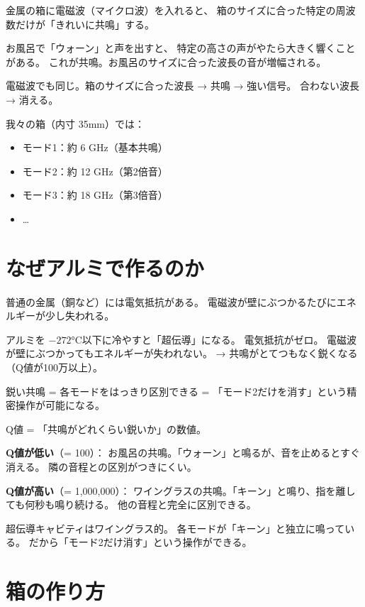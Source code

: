 \documentclass[12pt,a4paper]{article}
\begin{document}
金属の箱に電磁波（マイクロ波）を入れると、
箱のサイズに合った特定の周波数だけが「きれいに共鳴」する。

\begin{naruhodox}[共鳴とは]
お風呂で「ウォーン」と声を出すと、
特定の高さの声がやたら大きく響くことがある。
これが共鳴。お風呂のサイズに合った波長の音が増幅される。

電磁波でも同じ。箱のサイズに合った波長 → 共鳴 → 強い信号。
合わない波長 → 消える。

我々の箱（内寸 35mm）では：
\begin{itemize}
\item モード1：約 6 GHz（基本共鳴）
\item モード2：約 12 GHz（第2倍音）
\item モード3：約 18 GHz（第3倍音）
\item \ldots
\end{itemize}
\end{naruhodox}

\section{なぜアルミで作るのか}

\begin{naruhodox}[超伝導のすごさ]
普通の金属（銅など）には電気抵抗がある。
電磁波が壁にぶつかるたびにエネルギーが少し失われる。

アルミを $-272$°C以下に冷やすと「超伝導」になる。
電気抵抗がゼロ。
電磁波が壁にぶつかってもエネルギーが失われない。
→ 共鳴がとてつもなく鋭くなる（Q値が100万以上）。

鋭い共鳴 = 各モードをはっきり区別できる
= 「モード2だけを消す」という精密操作が可能になる。
\end{naruhodox}

\begin{tatoebabox}
Q値 = 「共鳴がどれくらい鋭いか」の数値。

\textbf{Q値が低い}（= 100）：
お風呂の共鳴。「ウォーン」と鳴るが、音を止めるとすぐ消える。
隣の音程との区別がつきにくい。

\textbf{Q値が高い}（= 1,000,000）：
ワイングラスの共鳴。「キーン」と鳴り、指を離しても何秒も鳴り続ける。
他の音程と完全に区別できる。

超伝導キャビティはワイングラス的。
各モードが「キーン」と独立に鳴っている。
だから「モード2だけ消す」という操作ができる。
\end{tatoebabox}

\section{箱の作り方}
\end{document}
